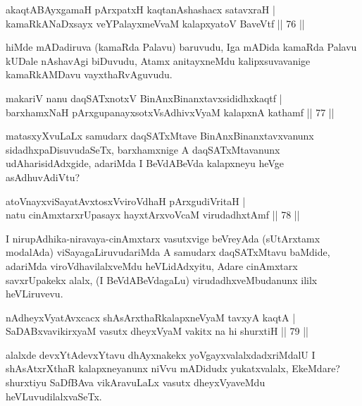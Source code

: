 \begin{shl}
akaqtABAyxgamaH pArxpatxH kaqtanAshashacx satavxraH  | \\
kamaRkANaDxsayx veYPalayxmeVvaM kalapxyatoV BaveVtf \hfill||  76 ||  
\end{shl}

\begin{artha}
hiMde mADadiruva (kamaRda Palavu) baruvudu, Iga mADida kamaRda Palavu kUDale nAshavAgi biDuvudu, Atamx anitayxneMdu kalipxsuvavanige kamaRkAMDavu vayxthaRvAguvudu.
\end{artha}


\begin{shl}
makariV nanu daqSATxnotxV BinAnxBinanxtavxsididhxkaqtf  | \\
barxhamxNaH pArxgupanayxsotxV\s sAdhivxVyaM kalapxnA kathamf \hfill||  77 ||  
\end{shl}

\begin{artha}
matasxyXvuLaLx samudarx daqSATxMtave BinAnxBinanxtavxvanunx sidadhxpaDisuvudaSeTx, barxhamxnige A daqSATxMtavanunx udAharisidAdxgide, adariMda I BeVdABeVda kalapxneyu heVge asAdhuvAdiVtu?
\end{artha}


\begin{shl}
atoV\s nayxviSayatAvxtosxV\s viroVdhaH pArxgudiVritaH  | \\
natu cinAmxtarxrUpasayx hayxtArxvoVcaM virudadhxtAmf \hfill||  78 ||  
\end{shl}

\begin{artha}
I nirupAdhika-niravaya-cinAmxtarx vasutxvige beVreyAda (sUtArxtamx modalAda) viSayagaLiruvudariMda A samudarx daqSATxMtavu baMdide, adariMda viroVdhavilalxveMdu heVLidAdxyitu, Adare cinAmxtarx savxrUpakekx alalx, (I BeVdABeVdagaLu) virudadhxveMbudanunx ililx heVLiruvevu.
\end{artha}

\begin{shl}
nAdheyxVyatAvxcacx shAsArxthaRkalapxneVyaM tavxyA kaqtA  | \\
SaDABxvavikirxyaM vasutx dheyxVyaM vakitx na hi shurxtiH \hfill||  79 ||  
\end{shl}

\begin{artha}
alalxde devxYtAdevxYtavu dhAyxnakekx yoVgayxvalalxdadxriMdalU I shAsAtxrXthaR kalapxneyanunx niVvu mADidudx yukatxvalalx, EkeMdare? shurxtiyu SaDfBAva vikAravuLaLx vasutx dheyxVyaveMdu heVLuvudilalxvaSeTx.
\end{artha}

